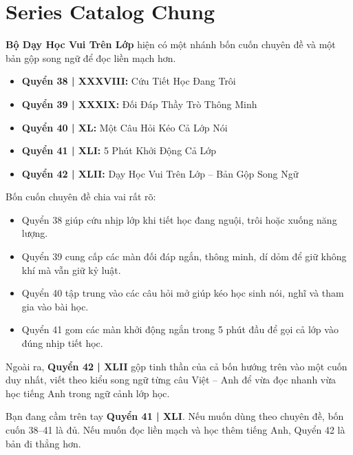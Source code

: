 \chapter*{Series Catalog Chung}

\textbf{Bộ Dạy Học Vui Trên Lớp} hiện có một nhánh bốn cuốn chuyên đề và một bản gộp song ngữ để đọc liền mạch hơn.

\begin{itemize}
\item \textbf{Quyển 38 | XXXVIII:} Cứu Tiết Học Đang Trôi
\item \textbf{Quyển 39 | XXXIX:} Đối Đáp Thầy Trò Thông Minh
\item \textbf{Quyển 40 | XL:} Một Câu Hỏi Kéo Cả Lớp Nói
\item \textbf{Quyển 41 | XLI:} 5 Phút Khởi Động Cả Lớp
\item \textbf{Quyển 42 | XLII:} Dạy Học Vui Trên Lớp -- Bản Gộp Song Ngữ
\end{itemize}

Bốn cuốn chuyên đề chia vai rất rõ:

\begin{itemize}
\item Quyển 38 giúp cứu nhịp lớp khi tiết học đang nguội, trôi hoặc xuống năng lượng.
\item Quyển 39 cung cấp các màn đối đáp ngắn, thông minh, dí dỏm để giữ không khí mà vẫn giữ kỷ luật.
\item Quyển 40 tập trung vào các câu hỏi mở giúp kéo học sinh nói, nghĩ và tham gia vào bài học.
\item Quyển 41 gom các màn khởi động ngắn trong 5 phút đầu để gọi cả lớp vào đúng nhịp tiết học.
\end{itemize}

Ngoài ra, \textbf{Quyển 42 | XLII} gộp tinh thần của cả bốn hướng trên vào một cuốn duy nhất, viết theo kiểu song ngữ từng câu Việt -- Anh để vừa đọc nhanh vừa học tiếng Anh trong ngữ cảnh lớp học.

Bạn đang cầm trên tay \textbf{Quyển 41 | XLI}. Nếu muốn dùng theo chuyên đề, bốn cuốn 38--41 là đủ. Nếu muốn đọc liền mạch và học thêm tiếng Anh, Quyển 42 là bản đi thẳng hơn.